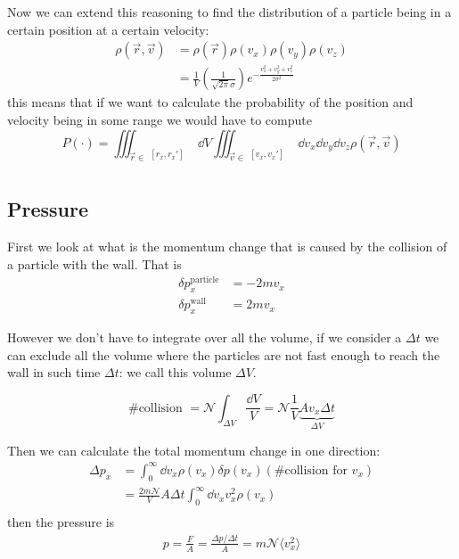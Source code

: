 \documentclass[12pt]{extarticle}
\newcommand{\anglebraces}[1]{
    \langle #1 \rangle
}
\begin{document}
Now we can extend this reasoning to find the distribution of a particle being in a certain position at a certain velocity:
\begin{align}
    \rho(\vec r, \vec v) & = \rho(\vec r) \rho(v_x) \rho(v_y) \rho(v_z)                                                           \\
                         & = \frac{1}{V} \left(\frac{1}{\sqrt{2 \pi} \sigma}\right) e^{-\frac{v_x^2 + v_y^2 + v_z^2}{2 \sigma^2}}
\end{align}
this means that if we want to calculate the probability of the position and velocity being in some range we would have to compute
\begin{equation}
    P(\cdot) = \iiint_{\vec r \in \substack{[r_x, r_x']                                                             \\ [r_y, r_y'] \\ [r_z, r_z']}} \dd{V} \iiint_{\vec v \in \substack{[v_x, v_x']                                                             \\ [v_y, v_y'] \\ [v_z, v_z']}} \dd{v_x} \dd{v_y} \dd{v_z} \rho(\vec r, \vec v)
\end{equation}

\subsection{Pressure}

First we look at what is the momentum change that is caused by the collision of a particle with the wall.
That is
\begin{align}
    \delta p^\text{particle}_x & = -2 m v_x \\
    \delta p^\text{wall}_x     & = 2 m v_x
\end{align}

However we don't have to integrate over all the volume, if we consider a $\Delta t$ we can exclude all the volume where the particles are not fast enough to reach the wall in such time $\Delta t$: we call this volume $\Delta V$.

\begin{equation}
    \text{\# collision } = \mathscr{N} \int_{\Delta V} \frac{\dd{V}}{V} = \mathscr{N} \frac{1}{V} \underbrace{A v_x \Delta t}_{\Delta V}
\end{equation}

Then we can calculate the total momentum change in one direction:
\begin{align}
    \Delta p_x & = \int_0^\infty \dd{v_x} \rho(v_x) \delta p(v_x) (\text{\# collision for }v_x) \\
               & =\frac{2m \mathscr{N}}{V} A \Delta t \int_0^\infty \dd{v_x} v_x^2 \rho(v_x)    \\
\end{align}
then the pressure is
\begin{align}
    p = \frac{F}{A} = \frac{\Delta p / \Delta t}{A} = m \mathscr{N} \anglebraces{v_x^2}
\end{align}
\end{document}
